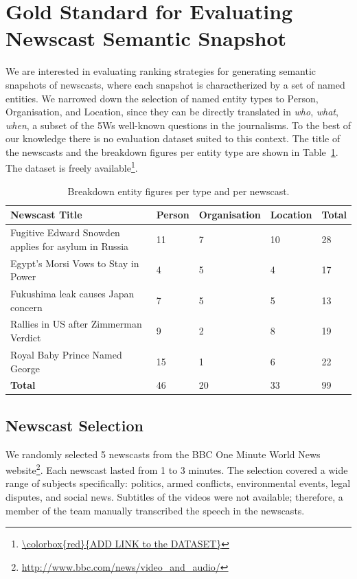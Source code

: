 \documentclass{llncs}
\newcommand{\todo}[1]{\colorbox{red}{#1}}
\begin{document}
\section{Gold Standard for Evaluating Newscast Semantic Snapshot}
\label{sec:GoldStandard}
We are interested in evaluating ranking strategies for generating semantic snapshots of newscasts, where each snapshot is charactherized by a set of named entities. We narrowed down the selection of named entity types to Person, Organisation, and Location, since they can be directly translated in \textit{who}, \textit{what}, \textit{when}, a subset of the 5Ws well-known questions in the journalisms. To the best of our knowledge there is no evaluation dataset suited to this context. The title of the newscasts and the breakdown figures per entity type are shown in Table~\ref{table:entitydistribution}. The dataset is freely available\footnote{\url{\todo{ADD LINK to the DATASET}}}.

\begin{table}
\begin{tabular}{| p{6cm} | l| l| l| l|}
  \hline
  \textbf{Newscast Title} & \textbf{Person} & \textbf{Organisation} &\textbf{Location} & \textbf{Total} \\
    \hline
  Fugitive Edward Snowden applies for asylum in Russia & 11 & 7 & 10 & 28 \\
    \hline
 Egypt's Morsi Vows to Stay in Power & 4 & 5 & 4 & 17 \\
    \hline
 Fukushima leak causes Japan concern & 7 & 5 & 5 & 13\\
    \hline
 Rallies in US after Zimmerman Verdict & 9 & 2 & 8 & 19 \\
    \hline
 Royal Baby Prince Named George & 15 & 1 & 6 & 22 \\
    \hline
    \textbf{Total}  & 46 & 20 & 33 & 99\\
  \hline
\end{tabular}
\caption[Table caption text]{Breakdown entity figures per type and per newscast.}
\label{table:entitydistribution}
\end{table}

\subsection{Newscast Selection}
We randomly selected 5 newscasts from the BBC One Minute World News website\footnote{\url{http://www.bbc.com/news/video_and_audio/}}. Each newscast lasted from 1 to 3 minutes. The selection covered a wide range of subjects specifically: politics, armed conflicts, environmental events, legal disputes, and social news. 
Subtitles of the videos were not available; therefore, a member of the team manually transcribed the speech in the newscasts.
\end{document}
